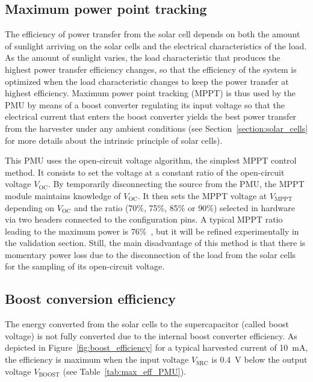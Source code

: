 \documentclass{EPL-master-thesis-covers-EN}
\newcommand{\te}[1]{\textrm{#1}}
\begin{document}
\subsection*{Maximum power point tracking}

The efficiency of power transfer from the solar cell depends on both the amount of sunlight arriving on the solar cells and the electrical characteristics of the load. As the amount of sunlight varies, the load characteristic that produces the highest power transfer efficiency changes, so that the efficiency of the system is optimized when the load characteristic changes to keep the power transfer at highest efficiency. 
Maximum power point tracking (MPPT) is thus used by the PMU by means of a boost converter regulating its input voltage so that the electrical current that enters the boost converter yields the best power transfer from the harvester under any ambient conditions (see Section~\ref{section:solar_cells} for more details about the intrinsic principle of solar cells).

This PMU uses the open-circuit voltage algorithm, the simplest MPPT control method. It consists to set the voltage at a constant ratio of the open-circuit voltage $V_\te{OC}$. By temporarily disconnecting the source from the PMU, the MPPT module maintains knowledge of $V_\te{OC}$. It then sets the MPPT voltage at $V_\te{MPPT}$ depending on $V_\te{OC}$ and the ratio (70\%, 75\%, 85\% or 90\%) selected in hardware via two headers connected to the configuration pins. A typical MPPT ratio leading to the maximum power is 76\%~\cite{10.1109/ICSTE.2010.5608868}, but it will be refined experimentally in the validation section. Still, the main disadvantage of this method is that there is momentary power loss due to the disconnection of the load from the solar cells for the sampling of its open-circuit voltage.


\subsection*{Boost conversion efficiency}

The energy converted from the solar cells to the supercapacitor (called boost voltage) is not fully converted due to the internal boost converter efficiency. As depicted in Figure~\ref{fig:boost_efficiency} for a typical harvested current of \SI{10}{mA}, the efficiency is maximum when the input voltage $V_\te{SRC}$ is \SI{0.4}{V} below the output voltage $V_\te{BOOST}$ (see Table~\ref{tab:max_eff_PMU}).
\end{document}
